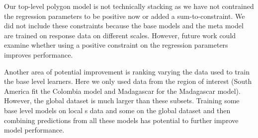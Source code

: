 \documentclass[11pt]{article}
\begin{document}



Our top-level polygon model is not technically stacking as we have not contrained the regression parameters to be positive now or added a sum-to-constraint.
We did not include these constraints because the base models and the meta model are trained on response data on different scales.
However, future work could examine whether using a positive constraint on the regression parameters improves performance.

Another area of potential improvement is ranking varying the data used to train the base level learners.
Here we only used data from the region of interest (South America fit the Colombia model and Madagascar for the Madagascar model).
However, the global dataset is much larger than these subsets.
Training some base level models on local s data and some on the global dataset and then combining predictions from all these models has potential to further improve model performance.


 

\end{document}
